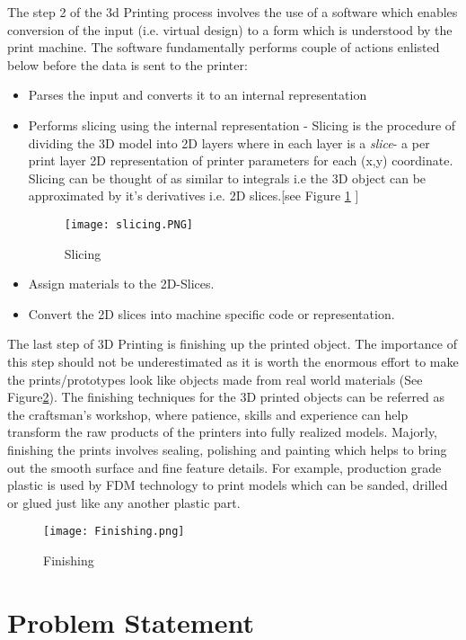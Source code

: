 The step 2 of the 3d Printing process involves the use of a software which enables conversion of the input (i.e. virtual design) to a form which is understood by the print machine. The software fundamentally performs couple of actions enlisted below before the data is sent to the printer:
\begin{itemize}
\item Parses the input and converts it to an internal representation
\item Performs slicing using the internal representation - Slicing is the procedure of dividing the 3D model into 2D layers where in each layer is a \textsl{slice}- a per print layer 2D representation of printer parameters for each (x,y) coordinate. Slicing can be thought of as similar to integrals i.e the 3D object can be approximated by it's derivatives i.e. 2D slices.[see Figure \ref{fig:slicing} \cite{slicing}]
\begin{figure}[ht!]
\centering
\texttt{[image: slicing.PNG]}
\caption{Slicing}
\label{fig:slicing}
\end{figure}

\item Assign materials to the 2D-Slices. 
\item Convert the 2D slices into machine specific code or representation.
\end{itemize}

The last step of 3D Printing is finishing up the printed object. The importance of this step should not be underestimated as it is worth the enormous effort to make the prints/prototypes look like objects made from real world materials (See Figure\ref{fig:Finishing}). The finishing techniques for the 3D printed objects can be referred as the craftsman's workshop, where patience, skills and experience can help transform the raw products of the printers into fully realized models. Majorly, finishing the prints involves sealing, polishing and painting which helps to bring out the smooth surface and fine feature details. For example, production grade plastic is used by FDM technology to print models which can be sanded, drilled or glued just like any another plastic part. 

\begin{figure}[ht!]
\centering
\texttt{[image: Finishing.png]}
\caption{Finishing}
\label{fig:Finishing}
\end{figure}


\section{Problem Statement}

